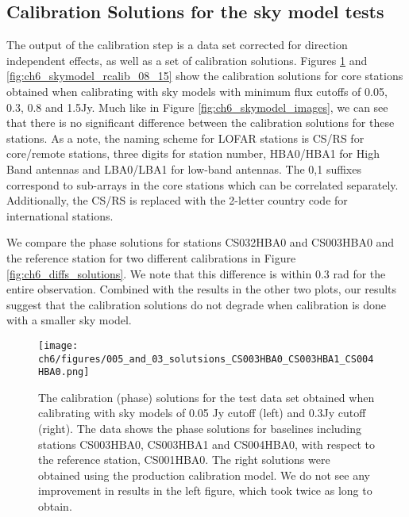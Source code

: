 \begin{subappendices}




\section{Calibration Solutions for the sky model tests }\label{ap:calib_solutions}
The output of the calibration step is a data set corrected for direction independent effects, as well as a set of calibration solutions. Figures \ref{fig:ch6_skymodel_rcalib_004_03} and \ref{fig:ch6_skymodel_rcalib_08_15} show the calibration solutions for core stations obtained when calibrating with sky models with minimum flux cutoffs of 0.05, 0.3, 0.8 and 1.5Jy. Much like in Figure \ref{fig:ch6_skymodel_images}, we can see that there is no significant difference between the calibration solutions for these stations. As a note, the naming scheme for LOFAR stations is CS/RS for core/remote stations, three digits for station number, HBA0/HBA1 for High Band antennas and LBA0/LBA1 for low-band antennas. The 0,1 suffixes correspond to sub-arrays in the core stations which can be correlated separately. Additionally, the CS/RS is replaced with the 2-letter country code for international stations\citep{staiton_data_cookbook}.

We compare the phase solutions for stations CS032HBA0 and CS003HBA0 and the reference station for two different calibrations in Figure \ref{fig:ch6_diffs_solutions}. We note that this difference is within 0.3 rad for the entire observation. Combined with the results in the other two plots, our results suggest that the calibration solutions do not degrade when calibration is done with a smaller sky model.

\begin{figure}
    \texttt{[image: ch6/figures/005\_and\_03\_solutsions\_CS003HBA0\_CS003HBA1\_CS004HBA0.png]}
      \caption{The calibration (phase) solutions for the test data set obtained when calibrating with sky models of 0.05 Jy cutoff (left) and 0.3Jy cutoff (right). The data shows the phase solutions for baselines including stations CS003HBA0, CS003HBA1 and CS004HBA0, with respect to the reference station, CS001HBA0. The right solutions were obtained using the production calibration model. We do not see any improvement in results in the left figure, which took twice as long to obtain.}
	\label{fig:ch6_skymodel_rcalib_004_03}
\end{figure}


\end{subappendices}
